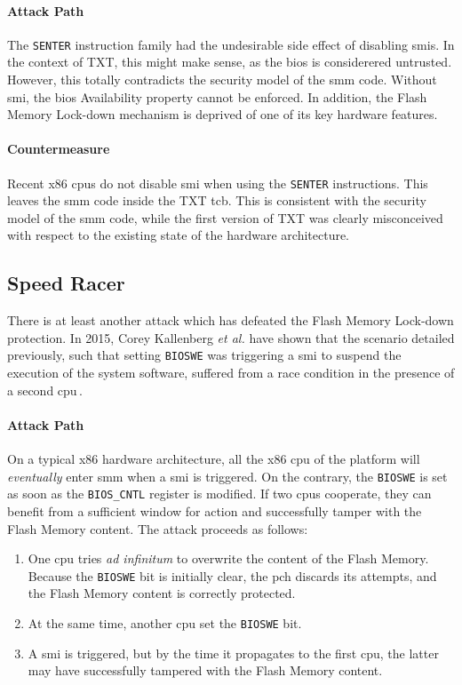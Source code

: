 \paragraph{Attack Path}
%
The \texttt{SENTER} instruction family had the undesirable side effect of
disabling \acp{smi}.
%
In the context of TXT, this might make sense, as the \ac{bios} is considerered
untrusted.
%
However, this totally contradicts the security model of the \ac{smm} code.
%
Without \ac{smi}, the \ac{bios} Availability property cannot be enforced.
%
In addition, the Flash Memory Lock-down mechanism is deprived of one of its key
hardware features.

\paragraph{Countermeasure}
%
Recent x86 \acp{cpu} do not disable \ac{smi} when using the \texttt{SENTER}
instructions.
%
This leaves the \ac{smm} code inside the TXT \ac{tcb}.
%
This is consistent with the security model of the \ac{smm} code, while the first
version of TXT was clearly misconceived with respect to the existing state of
the hardware architecture.

\subsection{Speed Racer}
\label{subsec:usecase:hse:speed}

There is at least another attack which has defeated the Flash Memory Lock-down
protection.
%
In 2015, Corey Kallenberg \emph{et al.} have shown that the scenario detailed
previously, such that setting \texttt{BIOSWE} was triggering a \ac{smi} to
suspend the execution of the system software, suffered from a race condition in
the presence of a second \ac{cpu}\,\cite{kallenberg2015racecondition}.

\paragraph{Attack Path}
%
On a typical x86 hardware architecture, all the x86 \ac{cpu} of the platform
will \emph{eventually} enter \ac{smm} when a \ac{smi} is triggered.
%
On the contrary, the \texttt{BIOSWE} is set as soon as the \texttt{BIOS\_CNTL}
register is modified.
%
If two \acp{cpu} cooperate, they can benefit from a sufficient window for action
and successfully tamper with the Flash Memory content.
%
The attack proceeds as follows:

\begin{enumerate}
\item One \ac{cpu} tries \emph{ad infinitum} to overwrite the content of the
  Flash Memory. Because the \texttt{BIOSWE} bit is initially clear, the \ac{pch}
  discards its attempts, and the Flash Memory content is correctly protected.
%
\item At the same time, another \ac{cpu} set the \texttt{BIOSWE} bit.
%
\item A \ac{smi} is triggered, but by the time it propagates to the first
  \ac{cpu}, the latter may have successfully tampered with the Flash Memory
  content.
%
\end{enumerate}

